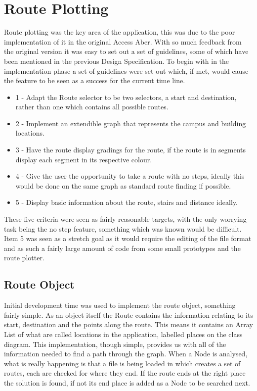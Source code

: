 \section{Route Plotting}
Route plotting was the key area of the application, this was due to the poor implementation of it in the original Access Aber. With so much feedback from the original version it was easy to set out a set of guidelines, some of which have been mentioned in the previous Design Specification. To begin with in the implementation phase a set of guidelines were set out which, if met, would cause the feature to be seen as a success for the current time line. 

\begin{itemize}
	\item 1 - Adapt the Route selector to be two selectors, a start and destination, rather than one which contains all possible routes.
	\item 2 - Implement an extendible graph that represents the campus and building locations.
	\item 3 - Have the route display gradings for the route, if the route is in segments display each segment in its respective colour.
	\item 4 - Give the user the opportunity to take a route with no steps, ideally this would be done on the same graph as standard route finding if possible.
	\item 5 - Display basic information about the route, stairs and distance ideally.  
\end{itemize}

These five criteria were seen as fairly reasonable targets, with the only worrying task being the no step feature, something which was known would be difficult. Item 5 was seen as a stretch goal as it would require the editing of the file format and as such a fairly large amount of code from some small prototypes and the route plotter.
\subsection{Route Object}

Initial development time was used to implement the route object, something fairly simple. As an object itself the Route contains the information relating to its start, destination and the points along the route. This means it contains an Array List of what are called locations in the application, labelled places on the class diagram. This implementation, though simple, provides us with all of the information needed to find a path through the graph. When a Node is analysed, what is really happening is that a file is being loaded in which creates a set of routes, each are checked for where they end. If the route ends at the right place the solution is found, if not its end place is added as a Node to be searched next. 

